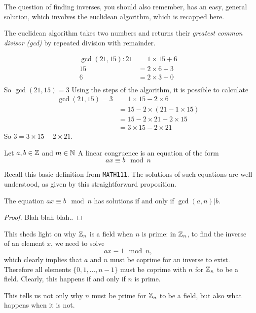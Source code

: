 The question of finding inverses, you should also remember, has an easy, general solution, which involves the euclidean algorithm, which is recapped here.
\begin{definition}
	The euclidean algorithm takes two numbers and returns their \emph{greatest common divisor (gcd)} by repeated division with remainder.
\end{definition}
\begin{align*}
	\gcd(21,15):21 &= 1\times15 + 6\\
	15 &= 2\times6 + 3\\
	6 &= 2\times3 + 0\\
\end{align*}
So $\gcd(21,15)=3$
Using the steps of the algorithm, it is possible to calculate
\begin{align*}
	\gcd(21,15) = 3 &= 1\times15 - 2\times6\\
	&= 15 - 2\times(21 - 1\times15)\\
	&= 15 - 2\times21 + 2\times15\\
	&=3\times15 - 2\times21
\end{align*}
So $3 = 3\times15 - 2\times21$. %
\begin{definition}
	Let $a,b \in \mathbb{Z}$ and $m \in \mathbb{N}$ A linear congruence is an equation of the form
	$$ax \equiv b \mod n$$
\end{definition}
Recall this basic definition from \texttt{MATH111}. The solutions of such equations are well understood, as given by this straightforward proposition.
\begin{proposition}
	The equation $ax \equiv b \mod n$ has solutions if and only if $\gcd(a,n)|b$.
\end{proposition}
\begin{proof}
	Blah blah blah..
\end{proof}
This sheds light on why $\mathbb{Z}_{n}$ is a field when $n$ is prime: in $\mathbb{Z}_{n}$, to find the inverse of an element $x$, we need to solve
$$ax \equiv 1 \mod n,$$
which clearly implies that $a$ and $n$ must be coprime for an inverse to exist. Therefore all elements $\{0,1,\ldots,n-1\}$ must be coprime with $n$ for $\mathbb{Z}_{n}$ to be a field. Clearly, this happens if and only if $n$ is prime.

This tells us not only why $n$ must be prime for $\mathbb{Z}_{n}$ to be a field, but also what happens when it is not.
